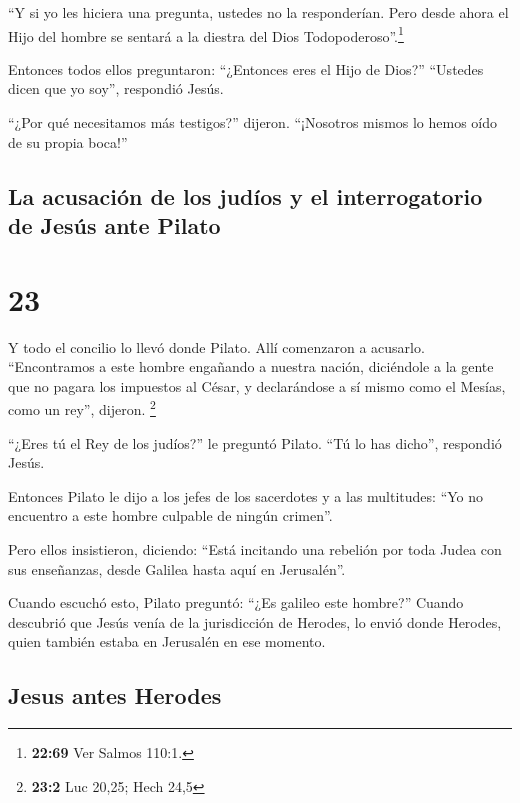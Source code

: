  ``Y si yo les hiciera una pregunta, ustedes no la
responderían.  Pero desde ahora el Hijo del hombre se
sentará a la diestra del Dios Todopoderoso''.\footnote{\textbf{22:69}
  Ver Salmos 110:1.}

 Entonces todos ellos preguntaron: ``¿Entonces eres el
Hijo de Dios?'' ``Ustedes dicen que yo soy'', respondió Jesús.

 ``¿Por qué necesitamos más testigos?'' dijeron.
``¡Nosotros mismos lo hemos oído de su propia boca!''

\hypertarget{la-acusaciuxf3n-de-los-juduxedos-y-el-interrogatorio-de-jesuxfas-ante-pilato}{%
\subsection{La acusación de los judíos y el interrogatorio de Jesús ante
Pilato}\label{la-acusaciuxf3n-de-los-juduxedos-y-el-interrogatorio-de-jesuxfas-ante-pilato}}

\hypertarget{section-22}{%
\section{23}\label{section-22}}

 Y todo el concilio lo llevó donde Pilato. 
Allí comenzaron a acusarlo. ``Encontramos a este hombre engañando a
nuestra nación, diciéndole a la gente que no pagara los impuestos al
César, y declarándose a sí mismo como el Mesías, como un rey'', dijeron.
\footnote{\textbf{23:2} Luc 20,25; Hech 24,5}

 ``¿Eres tú el Rey de los judíos?'' le preguntó Pilato.
``Tú lo has dicho'', respondió Jesús.

 Entonces Pilato le dijo a los jefes de los sacerdotes y a
las multitudes: ``Yo no encuentro a este hombre culpable de ningún
crimen''.

 Pero ellos insistieron, diciendo: ``Está incitando una
rebelión por toda Judea con sus enseñanzas, desde Galilea hasta aquí en
Jerusalén''.

 Cuando escuchó esto, Pilato preguntó: ``¿Es galileo este
hombre?''  Cuando descubrió que Jesús venía de la
jurisdicción de Herodes, lo envió donde Herodes, quien también estaba en
Jerusalén en ese momento.

\hypertarget{jesus-antes-herodes}{%
\subsection{Jesus antes Herodes}\label{jesus-antes-herodes}}

